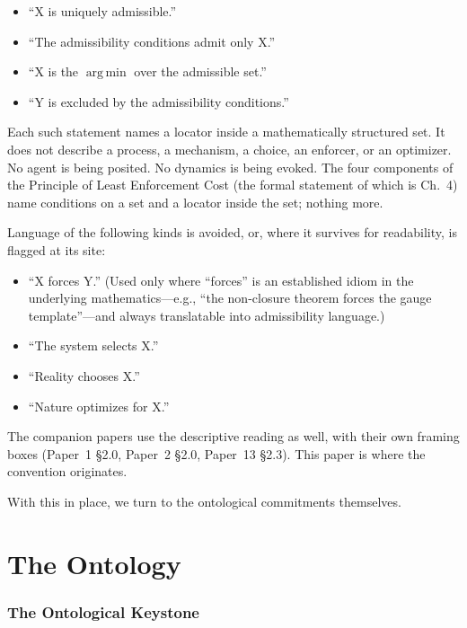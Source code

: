 \documentclass[11pt]{article}
\newcommand{\argmin}{\mathop{\mathrm{arg\,min}}}
\begin{document}
\begin{itemize}
    \item ``X is uniquely admissible.''
    \item ``The admissibility conditions admit only X.''
    \item ``X is the $\argmin$ over the admissible set.''
    \item ``Y is excluded by the admissibility conditions.''
\end{itemize}

\noindent Each such statement names a locator inside a mathematically structured set. It does not describe a process, a mechanism, a choice, an enforcer, or an optimizer. No agent is being posited. No dynamics is being evoked. The four components of the Principle of Least Enforcement Cost (the formal statement of which is Ch.~4) name conditions on a set and a locator inside the set; nothing more.

Language of the following kinds is avoided, or, where it survives for readability, is flagged at its site:

\begin{itemize}
    \item ``X forces Y.'' (Used only where ``forces'' is an established idiom in the underlying mathematics---e.g., ``the non-closure theorem forces the gauge template''---and always translatable into admissibility language.)
    \item ``The system selects X.''
    \item ``Reality chooses X.''
    \item ``Nature optimizes for X.''
\end{itemize}

\noindent The companion papers use the descriptive reading as well, with their own framing boxes (Paper~1 \S2.0, Paper~2 \S2.0, Paper~13 \S2.3). This paper is where the convention originates.

With this in place, we turn to the ontological commitments themselves.

\clearpage

\part{The Ontology}

\section{The Ontological Keystone}\label{sec:keystone}
\end{document}
